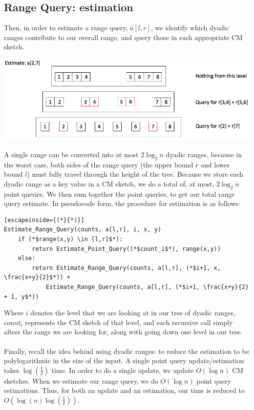 \documentclass[11pt]{article}
\begin{document}
{\subsection{Range Query: estimation}
Then, in order to estimate a range query, $\hat a[l,r]$, we identify which
dyadic ranges contribute to our overall range, and query those in each
appropriate CM sketch.
\begin{center}\includegraphics[scale=0.3]{range_estimate.png}\end{center}
A single range can be converted into at most $2\log_2n$ dyadic ranges, because
in the worst case, both sides of the range query (the upper bound $r$ and lower
bound $l$)  must fully travel through the height of the tree. Because we store
each dyadic range as a key value in a CM sketch, we do a total of, at most,
$2\log_2n$ point queries. We then sum together the point queries, to get our
total range query estimate. In pseudocode form, the procedure for estimation is
as follows:
\begin{lstlisting}[escapeinside={(*}{*)}]
Estimate_Range_Query(counts, a[l,r], i, x, y) 
    if (*$range(x,y) \in [l,r]$*):
        return Estimate_Point_Query((*$count_i$*), range(x,y))
    else:
        return Estimate_Range_Query(counts, a[l,r], (*$i+1, x, \frac{x+y}{2}$*)) +
            Estimate_Range_Query(counts, a[l,r], (*$i+1, \frac{x+y}{2} + 1, y$*))
\end{lstlisting}
Where $i$ denotes the level that we are looking at in our tree of dyadic ranges, $count_i$ represents the CM sketch of that level, and each recursive call simply alters the range we are looking for, along with going down one level in our tree.\\\\
Finally, recall the idea behind using dyadic ranges: to reduce the estimation to be polylogarithmic in the size of the input. A single point query update/estimation takes $\log(\frac{1}{\delta})$ time. In order to do a single update, we update $O(\log n)$ CM sketches. When we estimate our range query, we do $O(\log n)$ point query estimations. Thus, for both an update and an estimation, our time is reduced to $O(\log(n)\log(\frac{1}{\delta}))$.
}
\end{document}
